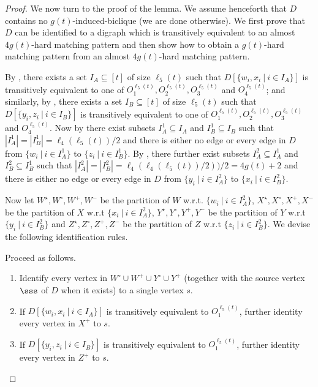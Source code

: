 \begin{proof}
\newcommand{\sizeWZ}{\ell_4(\ell_5(t))/2}
\newcommand{\sizeXY}{4g(t)+2}
\newcommand{\sizeXYo}{4g(t)+1}
\newcommand{\sizeXYt}{4g(t)}

We now turn to the proof of the lemma. We assume henceforth that $D$ contains no $g(t)$-induced-biclique (we are done otherwise). We first prove that $D$ can be identified to a digraph which is transitively equivalent to an almost $\sizeXYt$-hard matching pattern and then show how to obtain a $g(t)$-hard matching pattern from an almost $4g(t)$-hard matching pattern. 

By , there exists a set $I_A \subseteq [t]$ of size $\ell_5(t)$ such that $D[\{w_i,x_i~|~i \in I_A\}]$ is transitively equivalent to one of $O_1^{\ell_5(t)},O_2^{\ell_5(t)},O_3^{\ell_5(t)}$ and $O_4^{\ell_5(t)}$; and similarly, by , there exists a set $I_B \subseteq [t]$ of size $\ell_5(t)$ such that $D[\{y_i,z_i~|~i\in I_B\}]$ is transitively equivalent to one of $O_1^{\ell_5(t)},O_2^{\ell_5(t)},O_3^{\ell_5(t)}$ and $O_4^{\ell_5(t)}$. 
Now by  there exist subsets $I_A^1 \subseteq I_A$ and $I_B^1 \subseteq I_B$ such that $|I_A^1| = |I_B^1| = \sizeWZ$ and there is either no edge or every edge in $D$ from $\{w_i~|~i \in I_A^1\}$ to $\{z_i~|~i \in I_B^1\}$. 
By , there further exist subsets $I_A^2 \subseteq I_A^1$ and $I_B^2 \subseteq I_B^1$ such that $|I_A^2| = |I_B^2| = \ell_4(\ell_4(\ell_5(t))/2))/2 = \sizeXY$ and there is either no edge or every edge in $D$ from $\{y_i~|~i \in I_A^2\}$ to $\{x_i~|~i \in I_B^2\}$.
 
Now let $W^\star,W^\circ,W^+,W^-$ be the partition of $W$ w.r.t. $\{w_i~|~i \in I_A^2\}$,
$X^\star,X^\circ,X^+,X^-$ be the partition of $X$ w.r.t $\{x_i~|~i \in I_A^2\}$,
$Y^\star,Y^\circ,Y^+,Y^-$ be the partition of $Y$ w.r.t $\{y_i~|~i \in I_B^2\}$ 
and $Z^\star,Z^\circ,Z^+,Z^-$ be the partition of $Z$ w.r.t $\{z_i~|~i \in I_B^2\}$.
We devise the following identification rules.

\begin{identification rule}
\label{ir:source}
Proceed as follows.
\begin{enumerate}[nosep]
\item Identify every vertex in $W^\circ \cup W^+ \cup Y^\circ \cup Y^+$ (together with the source vertex $\sss$ of $D$ when it exists) to a single vertex $s$.
\item If $D[\{w_i,x_i~|~i \in I_A\}]$ is transitively equivalent to $O_1^{\ell_5(t)}$, further identity every vertex in $X^+$ to $s$.
\item If $D[\{y_i,z_i~|~i \in I_B\}]$ is transitively equivalent to $O_1^{\ell_5(t)}$, further identity every vertex in $Z^+$ to $s$.
\end{enumerate}
\end{identification rule}


\end{proof}

